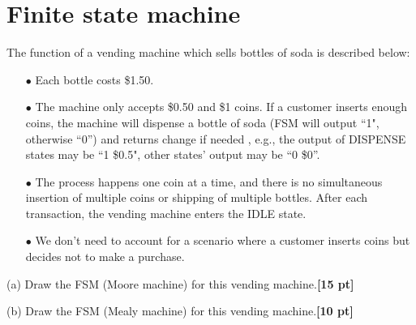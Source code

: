 \documentclass[a4paper]{article}
\begin{document}
\newpage
\section{Finite state machine}

The function of a vending machine which sells bottles of soda is described below:

\begin{itemize}
\item[$\bullet$] Each bottle costs \$1.50. 
\item[$\bullet$] The machine only accepts \$0.50 and \$1 coins. If a customer inserts enough coins, the machine will dispense a bottle of soda (FSM will output ``1", otherwise ``0'') and returns change if needed , e.g., the output of DISPENSE states may be ``1 \$0.5", other states' output may be ``0 \$0''.
\item[$\bullet$] The process happens one coin at a time, and there is no simultaneous insertion of multiple coins or shipping of multiple bottles. After each transaction, the vending machine enters the IDLE state.
\item[$\bullet$] We don’t need to account for a scenario where a customer inserts coins but decides not to make a purchase.
\end{itemize}


(a) Draw the FSM (Moore machine) for this vending machine.\textbf{[15 pt]}

(b) Draw the FSM (Mealy machine) for this vending machine.\textbf{[10 pt]}
\end{document}
